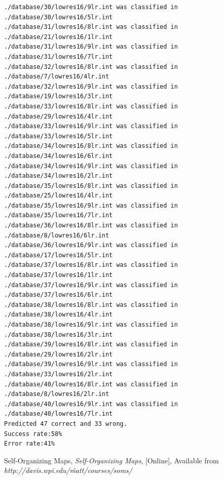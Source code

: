 \documentclass[a4paper,11pt,titlepage]{article}
\begin{document}
\begin{verbatim}
./database/30/lowres16/9lr.int was classified in ./database/30/lowres16/5lr.int
./database/31/lowres16/8lr.int was classified in ./database/21/lowres16/1lr.int
./database/31/lowres16/9lr.int was classified in ./database/31/lowres16/7lr.int
./database/32/lowres16/8lr.int was classified in ./database/7/lowres16/4lr.int
./database/32/lowres16/9lr.int was classified in ./database/19/lowres16/3lr.int
./database/33/lowres16/8lr.int was classified in ./database/29/lowres16/4lr.int
./database/33/lowres16/9lr.int was classified in ./database/33/lowres16/5lr.int
./database/34/lowres16/8lr.int was classified in ./database/34/lowres16/6lr.int
./database/34/lowres16/9lr.int was classified in ./database/34/lowres16/2lr.int
./database/35/lowres16/8lr.int was classified in ./database/25/lowres16/4lr.int
./database/35/lowres16/9lr.int was classified in ./database/35/lowres16/7lr.int
./database/36/lowres16/8lr.int was classified in ./database/8/lowres16/6lr.int
./database/36/lowres16/9lr.int was classified in ./database/17/lowres16/5lr.int
./database/37/lowres16/8lr.int was classified in ./database/37/lowres16/1lr.int
./database/37/lowres16/9lr.int was classified in ./database/37/lowres16/6lr.int
./database/38/lowres16/8lr.int was classified in ./database/38/lowres16/4lr.int
./database/38/lowres16/9lr.int was classified in ./database/38/lowres16/3lr.int
./database/39/lowres16/8lr.int was classified in ./database/29/lowres16/2lr.int
./database/39/lowres16/9lr.int was classified in ./database/33/lowres16/2lr.int
./database/40/lowres16/8lr.int was classified in ./database/8/lowres16/2lr.int
./database/40/lowres16/9lr.int was classified in ./database/40/lowres16/7lr.int
Predicted 47 correct and 33 wrong.
Success rate:58%
Error rate:41%

\end{verbatim}
\begin{thebibliography}{9}

 Self-Organizing Maps,
\emph{Self-Organizing Maps},	
[Online], Available from \emph{http://davis.wpi.edu/\~matt/courses/soms/}


\end{thebibliography}
\end{document}
